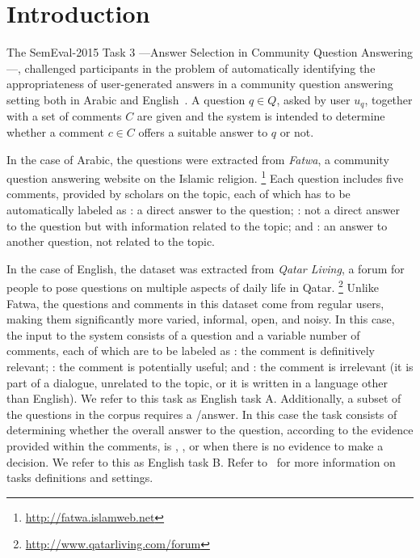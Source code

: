 \section{Introduction}
\label{sec:intro}


The SemEval-2015 Task 3 ---Answer Selection in Community Question Answering---, 
challenged participants in the problem of automatically identifying the 
appropriateness of user-generated answers in a community question answering 
setting both in Arabic and English~\cite{Marquez-EtAl:2015:SemEval}. A question 
$q\in Q$, asked by user $u_q$, together with a set of comments $C$ are given and 
the system is intended to determine whether a comment $c\in C$ offers a suitable 
answer to $q$ or not. 

In the case of Arabic, the questions were extracted from \textit{Fatwa}, a 
community question answering website on the Islamic religion.%
\footnote{\url{http://fatwa.islamweb.net}} 
Each question includes five comments, provided by scholars on 
the topic, each of which has to be automatically labeled as 
\Ni \dir: a direct answer to the question;
\Nii \rel: not a direct answer to the question but with information related to 
the topic; and 
\Niii \irel: an answer to another question, not related to the topic. 

In the case of English, the dataset was extracted from \textit{Qatar Living}, 
a forum for people to pose questions on multiple aspects of daily life in 
Qatar.%
\footnote{\url{http://www.qatarliving.com/forum}}
Unlike Fatwa, the questions and comments in this dataset come from regular 
users, making them significantly more varied, informal, open, and noisy. In 
this case, the input to the system consists of a question and a variable number 
of comments, each of which are to be labeled as 
\Ni \good: the comment is definitively relevant; 
\Nii \pot: the comment is potentially useful; and 
\Niii \bad: the comment is irrelevant (\eg it is part of a dialogue, unrelated 
to the topic, or it is written in a language other than English). 
We refer to this task as English task A. Additionally, a subset of the questions 
in the corpus requires a \yes/\no answer.
In this case the task consists of determining whether the overall answer to the 
question, according to the evidence provided within the comments, is 
\Ni \yes, 
\Nii \no, or 
\Niii \unsure when there is no evidence to make a decision. 
We refer to this as English task B. 
Refer to~\cite{Marquez-EtAl:2015:SemEval} for more information on tasks 
definitions and settings.


